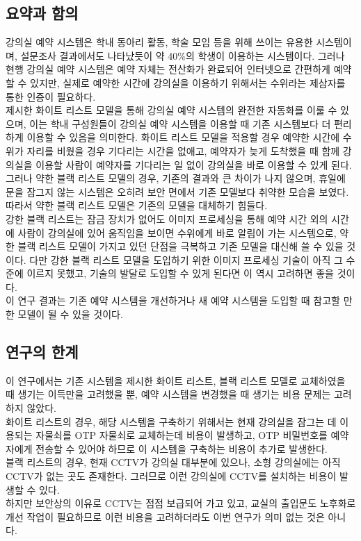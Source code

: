 \documentclass[11pt,a4paper]{article}
\begin{document}
\subsection{요약과 함의}
강의실 예약 시스템은 학내 동아리 활동, 학술 모임 등을 위해 쓰이는 유용한 시스템이며, 설문조사 결과에서도 나타났듯이 약 40\%의 학생이 이용하는 시스템이다. 그러나 현행 강의실 예약 시스템은 예약 자체는 전산화가 완료되어 인터넷으로 간편하게 예약할 수 있지만, 실제로 예약한 시간에 강의실을 이용하기 위해서는 수위라는 제삼자를 통한 인증이 필요하다.\\
제시한 화이트 리스트 모델을 통해 강의실 예약 시스템의 완전한 자동화를 이룰 수 있으며, 이는 학내 구성원들이 강의실 예약 시스템을 이용할 때 기존 시스템보다 더 편리하게 이용할 수 있음을 의미한다. 화이트 리스트 모델을 적용할 경우 예약한 시간에 수위가 자리를 비웠을 경우 기다리는 시간을 없애고, 예약자가 늦게 도착했을 때 함께 강의실을 이용할 사람이 예약자를 기다리는 일 없이 강의실을 바로 이용할 수 있게 된다.\\
그러나 약한 블랙 리스트 모델의 경우, 기존의 결과와 큰 차이가 나지 않으며, 휴일에 문을 잠그지 않는 시스템은 오히려 보안 면에서 기존 모델보다 취약한 모습을 보였다. 따라서 약한 블랙 리스트 모델은 기존의 모델을 대체하기 힘들다.\\
강한 블랙 리스트는 잠금 장치가 없어도 이미지 프로세싱을 통해 예약 시간 외의 시간에 사람이 강의실에 있어 움직임을 보이면 수위에게 바로 알림이 가는 시스템으로, 약한 블랙 리스트 모델이 가지고 있던 단점을 극복하고 기존 모델을 대신해 쓸 수 있을 것이다. 다만 강한 블랙 리스트 모델을 도입하기 위한 이미지 프로세싱 기술이 아직 그 수준에 이르지 못했고, 기술의 발달로 도입할 수 있게 된다면 이 역시 고려하면 좋을 것이다.\\
이 연구 결과는 기존 예약 시스템을 개선하거나 새 예약 시스템을 도입할 때 참고할 만한 모델이 될 수 있을 것이다.

\subsection{연구의 한계}
이 연구에서는 기존 시스템을 제시한 화이트 리스트, 블랙 리스트 모델로 교체하였을 때 생기는 이득만을 고려했을 뿐, 예약 시스템을 변경했을 때 생기는 비용 문제는 고려하지 않았다.\\
화이트 리스트의 경우, 해당 시스템을 구축하기 위해서는 현재 강의실을 잠그는 데 이용되는 자물쇠를 OTP 자물쇠로 교체하는데 비용이 발생하고, OTP 비밀번호를 예약자에게 전송할 수 있어야 하므로 이 시스템을 구축하는 비용이 추가로 발생한다.\\
블랙 리스트의 경우, 현재 CCTV가 강의실 대부분에 있으나, 소형 강의실에는 아직 CCTV가 없는 곳도 존재한다. 그러므로 이런 강의실에 CCTV를 설치하는 비용이 발생할 수 있다.\\
하지만 보안상의 이유로 CCTV는 점점 보급되어 가고 있고, 교실의 출입문도 노후화로 개선 작업이 필요하므로 이런 비용을 고려하더라도 이번 연구가 의미 없는 것은 아니다.
\end{document}
